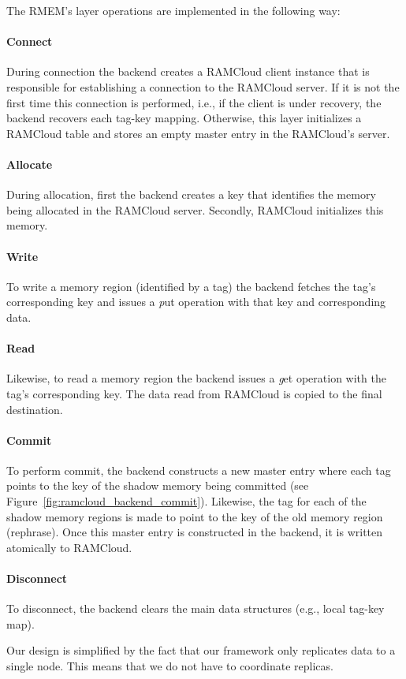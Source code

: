 The RMEM's layer operations are implemented in the following way:

\paragraph {\bf Connect} During connection the backend creates a RAMCloud
client instance that is responsible for establishing a connection to the
RAMCloud server.  If it is not the first time this connection is performed,
i.e., if the client is under recovery, the backend recovers each tag-key
mapping.  Otherwise, this layer initializes a RAMCloud table and stores an
empty master entry in the RAMCloud's server. 

\paragraph{\bf Allocate} During allocation, first the backend creates a key
that identifies the memory being allocated in the RAMCloud server. Secondly,
RAMCloud initializes this memory.

\paragraph{\bf Write} To write a memory region (identified by a tag) the
backend fetches the tag's corresponding key and issues a {\emph put } operation
with that key and corresponding data.  

\paragraph{\bf Read} Likewise, to read a memory region the backend issues a
{\emph get} operation with the tag's corresponding key. The data read from
RAMCloud is copied to the final destination.  

\paragraph{\bf Commit} To perform commit, the backend constructs a new master
entry where each tag points to the key of the shadow memory being committed
(see Figure~\ref{fig:ramcloud_backend_commit}). Likewise, the tag for each of
the shadow memory regions is made to point to the key of the old memory region
(rephrase). Once this master entry is constructed in the backend, it is written
atomically to RAMCloud.  

\paragraph{\bf Disconnect} To disconnect, the backend clears the main data
structures (e.g., local tag-key map).

Our design is simplified by the fact that our framework only replicates data to
a single node. This means that we do not have to coordinate replicas.
